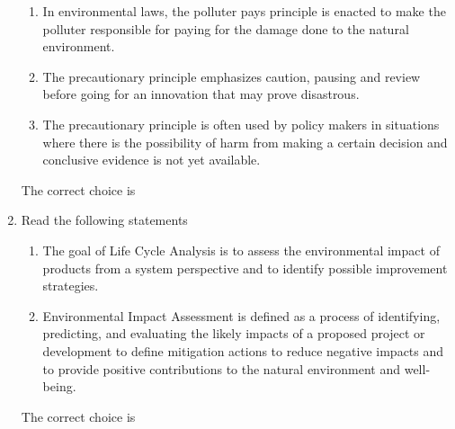 \documentclass[journal,12pt,onecolumn]{IEEEtran}
\theoremstyle{remark}
\begin{document}
\begin{enumerate}
\begin{enumerate}[label=\Roman*.]
\item In environmental laws, the polluter pays principle is enacted to make the polluter responsible for paying for the damage done to the natural environment.
\item The precautionary principle emphasizes caution, pausing and review before going for an innovation that may prove disastrous.
\item The precautionary principle is often used by policy makers in situations where there is the possibility of harm from making a certain decision and conclusive evidence is not yet available.
\end{enumerate}

The correct choice is

\begin{enumerate}
\end{enumerate}
\hfill{}
\item Read the following statements

\begin{enumerate}[label=\Roman*.]
\item The goal of Life Cycle Analysis  is to assess the environmental impact of products from a system perspective and to identify possible improvement strategies.
\item Environmental Impact Assessment  is defined as a process of identifying, predicting, and evaluating the likely impacts of a proposed project or development to define mitigation actions to reduce negative impacts and to provide positive contributions to the natural environment and well-being.
\end{enumerate}

The correct choice is

\begin{enumerate}
\end{enumerate}
\hfill{}


\end{enumerate}
\end{document}
